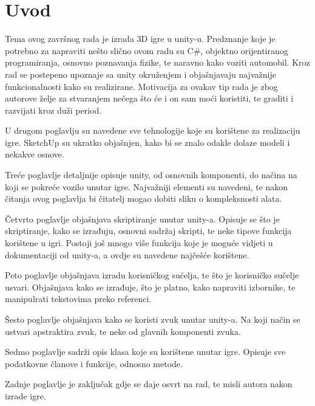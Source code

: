 \section{Uvod}
Tema ovog završnog rada je izrada 3D igre u unity-u. Predznanje koje je potrebno za napraviti nešto slično ovom radu su C\#, objektno orijentiranog programiranja, osnovno poznavanja fizike, te naravno kako voziti automobil. Kroz rad se postepeno upoznaje sa unity okruženjem i objašnjavaju najvažnije funkcionalnosti kako su realizirane. Motivacija za ovakav tip rada je zbog autorove želje za stvaranjem nečega što će i on sam moći koristiti, te graditi i razvijati kroz duži period.  \par

U drugom poglavlju su navedene sve tehnologije koje su korištene za realizaciju igre. SketchUp su ukratko objašnjen, kako bi se znalo odakle dolaze modeli i nekakve osnove. \par

Treće poglavlje detaljnije opisuje unity, od osnovnih komponenti, do načina na koji se pokreće vozilo unutar igre. Najvažniji elementi su navedeni, te nakon čitanja ovog poglavlja bi čitatelj mogao dobiti sliku o kompleksnosti alata. \par

Četvrto poglavlje objašnjava skriptiranje unutar unity-a. Opisuje se što je skriptiranje, kako se izrađuju, osnovni sadržaj skripti, te neke tipove funkcija korištene u igri. Postoji još mnogo više funkcija koje je moguće vidjeti u dokumentaciji od unity-a, a ovdje su navedene najčešće korištene. \par

Peto poglavlje objašnjava izradu korisničkog sučelja, te što je korisničko sučelje usvari. Objašnjava kako se izrađuje, što je platno, kako napraviti izbornike, te manipulrati tekstovima preko referenci. \par

Šesto poglavlje objašnjava kako se koristi zvuk unutar unity-a. Na koji način se ustvari apstraktira zvuk, te neke od glavnih komponenti zvuka. \par

Sedmo poglavlje sadrži opis klasa koje su korištene unutar igre. Opisuje sve podatkovne članove i funkcije, odnosno metode. \par

Zadnje poglavlje je zaključak gdje se daje osvrt na rad, te misli autora nakon izrade igre.
